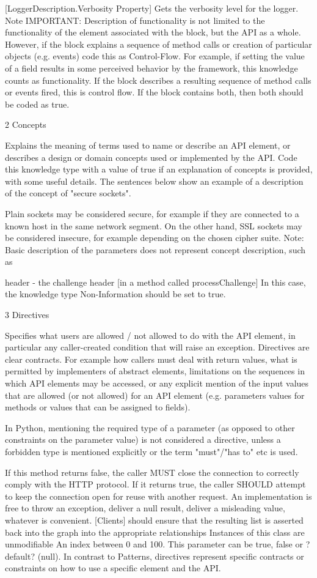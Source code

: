 [LoggerDescription.Verbosity Property] Gets the verbosity level for the logger.
Note IMPORTANT: Description of functionality is not limited to the functionality of the element associated with the block, but the API as a whole. However, if the block explains a sequence of method calls or creation of particular objects (e.g. events) code this as Control-Flow. For example, if setting the value of a field results in some perceived behavior by the framework, this knowledge counts as functionality. If the block describes a resulting sequence of method calls or events fired, this is control flow. If the block contains both, then both should be coded as true.

2 Concepts

Explains the meaning of terms used to name or describe an API element, or describes a design or domain concepts used or implemented by the API. Code this knowledge type with a value of true if an explanation of concepts is provided, with some useful details. The sentences below show an example of a description of the concept of "secure sockets".

Plain sockets may be considered secure, for example if they are connected to a known host in the same network segment. On the other hand, SSL sockets may be considered insecure, for example depending on the chosen cipher suite.
Note: Basic description of the parameters does not represent concept description, such as

header - the challenge header [in a method called processChallenge]
In this case, the knowledge type Non-Information should be set to true.

3 Directives

Specifies what users are allowed / not allowed to do with the API element, in particular any caller-created condition that will raise an exception. Directives are clear contracts. For example how callers must deal with return values, what is permitted by implementers of abstract elements, limitations on the sequences in which API elements may be accessed, or any explicit mention of the input values that are allowed (or not allowed) for an API element (e.g. parameters values for methods or values that can be assigned to fields).

In Python, mentioning the required type of a parameter (as opposed to other constraints on the parameter value) is not considered a directive, unless a forbidden type is mentioned explicitly or the term "must"/"has to" etc is used.

If this method returns false, the caller MUST close the connection to correctly comply with the HTTP protocol. If it returns true, the caller SHOULD attempt to keep the connection open for reuse with another request.
An implementation is free to throw an exception, deliver a null result, deliver a misleading value, whatever is convenient.
[Clients] should ensure that the resulting list is asserted back into the graph into the appropriate relationships
Instances of this class are unmodifiable
An index between 0 and 100.
This parameter can be true, false or ?default? (null).
In contrast to Patterns, directives represent specific contracts or constraints on how to use a specific element and the API.

